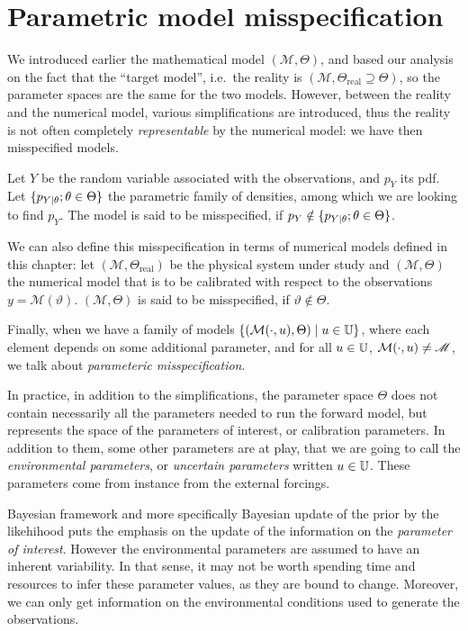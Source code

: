 \documentclass[../../Main_ManuscritThese.tex]{subfiles}
\begin{document}
\section{Parametric model misspecification}
\label{sec:model_misspecification}
We introduced earlier the mathematical model $(\mathcal{M},\Theta)$, and based our analysis on the fact that the ``target model'', i.e.\ the reality is $(\mathscr{M},\Theta_{\mathrm{real}} \supseteq \Theta)$, so the parameter spaces are the same for the two models. However, between the reality and the numerical model, various simplifications are introduced, thus the reality is not often completely \emph{representable} by the numerical model: we have then misspecified models.

\begin{definition}
  Let $Y$ be the random variable associated with the observations, and $p_Y$ its pdf. Let $\{p_{Y \mid \theta} ; \theta \in \Theta\}$ the parametric family of densities, among which we are looking to find $p_Y$. The model is said to be misspecified, if $p_Y \notin \{p_{Y \mid \theta} ; \theta \in \Theta\}$.

  We can also define this misspecification in terms of numerical models defined in this chapter:  
  let $(\mathscr{M},\Theta_{\mathrm{real}})$ be the physical system under study and $(\mathcal{M},\Theta)$ the numerical model that is to be calibrated with respect to the observations $y=\mathscr{M}(\vartheta)$. $(\mathcal{M}, \Theta)$ is said to be misspecified, if $\vartheta \notin \Theta$.

  Finally, when we have a family of models $\{(\mathcal{M}(\cdot, u),\Theta) \mid u \in\mathbb{U}\}$, where each element depends on some additional parameter, and for all $u\in \mathbb{U}$, $\mathcal{M}(\cdot,u) \neq \mathscr{M}$, we talk about \emph{parameteric misspecification}.
\end{definition}

In practice, in addition to the simplifications, the parameter space $\Theta$ does not contain necessarily all the parameters needed to run the forward model, but represents the space of the parameters of interest, or calibration parameters. In addition to them, some other parameters are at play, that we are going to call the \emph{environmental parameters}, or \emph{uncertain parameters} written $u\in \mathbb{U}$. These parameters come from instance from the external forcings. 



Bayesian framework and more specifically Bayesian update of the prior by the likehihood puts the emphasis on the update of the information on the \emph{parameter of interest}. However the environmental parameters are assumed to have an inherent variability. In that sense, it may not be worth spending time and resources to infer these parameter values, as they are bound to change.
Moreover, we can only get information on the environmental conditions used to generate the observations.
\end{document}
